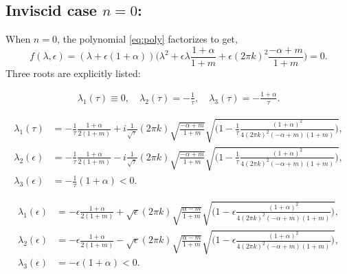 \documentclass[a4paper,11pt]{article}
\theoremstyle{remark}
\begin{document}
\subsection{Inviscid case $n=0$:}
When $n=0$, the polynomial \eqref{eq:poly} factorizes to get,
$$ f(\lambda,\epsilon) = (\lambda +\epsilon(1+\alpha))\Big( \lambda^2 + \epsilon\lambda \frac{1+\alpha}{1+m} + \epsilon (2\pi k)^2 \frac{-\alpha+m}{1+m}\Big)=0.$$
Three roots are explicitly listed:

\begin{align*}
 \lambda_1(\tau)\equiv 0, \quad \lambda_2(\tau)= -\frac{1}{\tau}, \quad \lambda_3(\tau) = -\frac{1+\alpha}{\tau}.
\end{align*}

\begin{align*}
 \lambda_1(\tau) &= - \frac{1}{\tau}\frac{1+\alpha}{2(1+m)} + i\frac{1}{\sqrt{\tau}}(2\pi k)\sqrt{\frac{-\alpha+m}{1+m}}\sqrt{\Big(1-\frac{1}{\tau} \frac{(1+\alpha)^2}{4(2\pi k)^2(-\alpha+m)(1+m)}\Big)},\\
 \lambda_2(\epsilon) &= - \frac{1}{\tau}\frac{1+\alpha}{2(1+m)} - i\frac{1}{\sqrt{\tau}}(2\pi k)\sqrt{\frac{-\alpha+m}{1+m}}\sqrt{\Big(1-\frac{1}{\tau} \frac{(1+\alpha)^2}{4(2\pi k)^2(-\alpha+m)(1+m)}\Big)},\\
 \lambda_3(\epsilon) &= -\frac{1}{\tau}(1+\alpha)<0.
\end{align*}


\begin{align*}
 \lambda_1(\epsilon) &= - \epsilon\frac{1+\alpha}{2(1+m)} + \sqrt{\epsilon}(2\pi k)\sqrt{\frac{\alpha-m}{1+m}}\sqrt{\Big(1-\epsilon \frac{(1+\alpha)^2}{4(2\pi k)^2(-\alpha+m)(1+m)}\Big)},\\
 \lambda_2(\epsilon) &= - \epsilon\frac{1+\alpha}{2(1+m)} - \sqrt{\epsilon}(2\pi k)\sqrt{\frac{\alpha-m}{1+m}}\sqrt{\Big(1-\epsilon \frac{(1+\alpha)^2}{4(2\pi k)^2(-\alpha+m)(1+m)}\Big)},\\
 \lambda_3(\epsilon) &= -\epsilon(1+\alpha)<0.
\end{align*}
\end{document}
